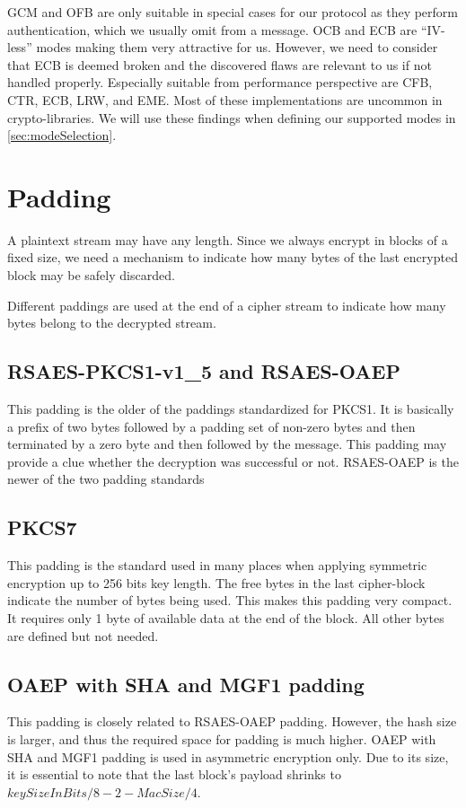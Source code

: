 GCM and OFB are only suitable in special cases for our protocol as they perform authentication, which we usually omit from a message. OCB and ECB are ``IV-less'' modes making them very attractive for us. However, we need to consider that ECB is deemed broken and the discovered flaws are relevant to us if not handled properly. Especially suitable from performance perspective are CFB, CTR, ECB, LRW, and EME. Most of these implementations are uncommon in crypto-libraries. We will use these findings when defining our supported modes in \cref{sec:modeSelection}.

\section{Padding}
A plaintext stream may have any length. Since we always encrypt in blocks of a fixed size, we need a mechanism to indicate how many bytes of the last encrypted block may be safely discarded. 

Different paddings are used at the end of a cipher stream to indicate how many bytes belong to the decrypted stream.

\subsection{RSAES-PKCS1-v1\_5 and RSAES-OAEP}
This padding is the older of the paddings standardized for PKCS1. It is basically a prefix of two bytes followed by a padding set of non-zero bytes and then terminated by a zero byte and then followed by the message. This padding may provide a clue whether the decryption was successful or not. RSAES-OAEP is the newer of the two padding standards 

\subsection{PKCS7} 
This padding is the standard used in many places when applying symmetric encryption up to 256 bits key length. The free bytes in the last cipher-block indicate the number of bytes being used. This makes this padding very compact. It requires only 1 byte of available data at the end of the block. All other bytes are defined but not needed.

\subsection{OAEP with SHA and MGF1 padding} 
This padding is closely related to RSAES-OAEP padding. However, the hash size is larger, and thus the required space for padding is much higher. OAEP with SHA and MGF1 padding is used in asymmetric encryption only. Due to its size, it is essential to note that the last block's payload shrinks to $keySizeInBits/8-2-MacSize/4$.

